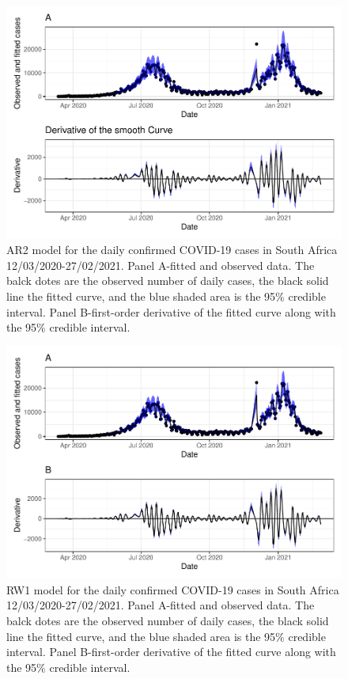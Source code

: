 \documentclass[10pt,letterpaper]{article}
\begin{document}
\begin{figure}[h]
\includegraphics[width=0.99\linewidth]{COVIDincidenceSA_files/figure-latex/unnamed-chunk-13-1} \caption{AR2 model for the daily confirmed COVID-19 cases in South Africa 12/03/2020-27/02/2021.  Panel A-fitted and observed data. The balck dotes are the observed number of daily cases, the black solid line the fitted curve, and the blue shaded area is the 95\% credible interval. Panel B-first-order derivative of the fitted curve along with the 95\% credible interval.}\label{fig:unnamed-chunk-13}
\end{figure}

\begin{figure}[h]
\includegraphics[width=0.99\linewidth]{COVIDincidenceSA_files/figure-latex/unnamed-chunk-14-1} \caption{RW1 model for the daily confirmed COVID-19 cases in South Africa 12/03/2020-27/02/2021.  Panel A-fitted and observed data. The balck dotes are the observed number of daily cases, the black solid line the fitted curve, and the blue shaded area is the 95\% credible interval. Panel B-first-order derivative of the fitted curve along with the 95\% credible interval.}\label{fig:unnamed-chunk-14}
\end{figure}
\end{document}
